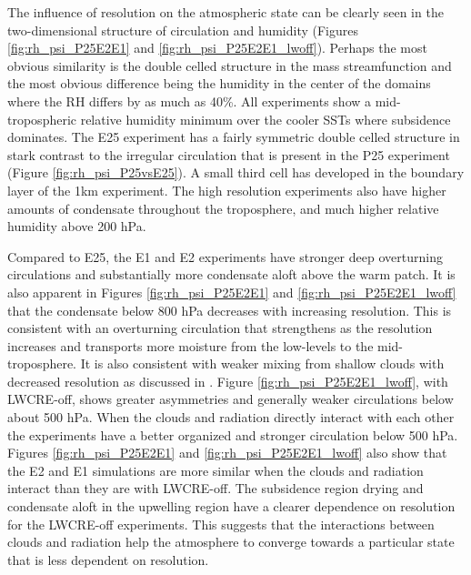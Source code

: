 \documentclass[draft]{agujournal2019}
\begin{document}
{The influence of resolution on the atmospheric state can be clearly seen in the two-dimensional structure 
of circulation and humidity (Figures \ref{fig:rh_psi_P25E2E1} and \ref{fig:rh_psi_P25E2E1_lwoff}).
Perhaps the most obvious similarity is the double celled structure in the mass streamfunction and the most 
obvious difference being the humidity in the center of the domains where the RH differs by as much as 40\%. %
All experiments show a mid-tropospheric relative humidity minimum over the cooler SSTs where subsidence 
dominates.  The E25 experiment has a fairly symmetric double celled structure in stark contrast to the irregular circulation 
that is present in the P25 experiment (Figure \ref{fig:rh_psi_P25vsE25}). 
A small third cell has developed in the boundary layer of the 1km experiment.   The high resolution experiments also have 
higher amounts of condensate throughout the troposphere, and much higher relative humidity 
above 200 hPa. 
 
Compared to E25, the E1 and E2 experiments have stronger deep overturning circulations and substantially 
more condensate aloft above the warm patch.    It is also apparent in Figures 
\ref{fig:rh_psi_P25E2E1} and \ref{fig:rh_psi_P25E2E1_lwoff} that the condensate below 800 hPa 
decreases with increasing resolution.  
This is consistent with an overturning circulation that 
strengthens as the resolution increases and transports more moisture from the low-levels to the 
mid-troposphere.  It is also consistent with weaker mixing from shallow clouds with decreased resolution as
discussed in .   Figure \ref{fig:rh_psi_P25E2E1_lwoff}, with LWCRE-off, shows greater asymmetries 
and generally weaker circulations below about 500 hPa.  
When the clouds and radiation directly interact with each other the experiments have a better
organized and stronger circulation below 500 hPa.  Figures \ref{fig:rh_psi_P25E2E1} and 
\ref{fig:rh_psi_P25E2E1_lwoff} also show that the E2 and E1 simulations are more 
similar when the clouds and radiation interact than they are with LWCRE-off.  The subsidence 
region drying and condensate aloft in the upwelling region have a clearer dependence on resolution for the
LWCRE-off experiments.  This suggests that the interactions between clouds and radiation help the 
atmosphere to converge towards a particular state that is less dependent on resolution.  
  
}
\end{document}
